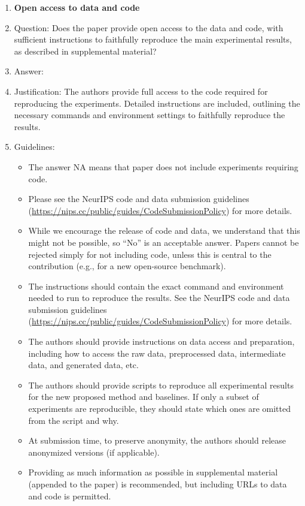 \documentclass{article}
\begin{document}
\begin{enumerate}
\item {\bf Open access to data and code}
    \item[] Question: Does the paper provide open access to the data and code, with sufficient instructions to faithfully reproduce the main experimental results, as described in supplemental material?
    \item[] Answer: \answerYes{} %
    \item[] Justification: The authors provide full access to the code required for reproducing the experiments. Detailed instructions are included, outlining the necessary commands and environment settings to faithfully reproduce the results.
    \item[] Guidelines:
    \begin{itemize}
        \item The answer NA means that paper does not include experiments requiring code.
        \item Please see the NeurIPS code and data submission guidelines (\url{https://nips.cc/public/guides/CodeSubmissionPolicy}) for more details.
        \item While we encourage the release of code and data, we understand that this might not be possible, so “No” is an acceptable answer. Papers cannot be rejected simply for not including code, unless this is central to the contribution (e.g., for a new open-source benchmark).
        \item The instructions should contain the exact command and environment needed to run to reproduce the results. See the NeurIPS code and data submission guidelines (\url{https://nips.cc/public/guides/CodeSubmissionPolicy}) for more details.
        \item The authors should provide instructions on data access and preparation, including how to access the raw data, preprocessed data, intermediate data, and generated data, etc.
        \item The authors should provide scripts to reproduce all experimental results for the new proposed method and baselines. If only a subset of experiments are reproducible, they should state which ones are omitted from the script and why.
        \item At submission time, to preserve anonymity, the authors should release anonymized versions (if applicable).
        \item Providing as much information as possible in supplemental material (appended to the paper) is recommended, but including URLs to data and code is permitted.
    \end{itemize}



\end{enumerate}
\end{document}
